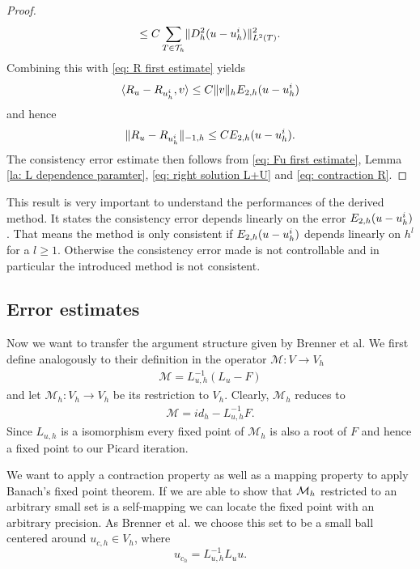 \begin{proof}
\begin{align}
	\leq C \sum_{T \in \mathcal{T}_h} \lVert D_h^2 (u-u_h^i) \rVert_{L^2(T)}^2.
	\end{align}
	Combining this with \eqref{eq: R first estimate} yields
	\begin{align*}
	 \langle R_u - R_{u^i_h}, v \rangle \leq C \lVert v \rVert_{h} E_{2,h}(u-u_h^i)
	\end{align*}
	and hence 
	\begin{align}
	\lVert R_u - R_{u^i_h} \rVert_{-1,h} \leq C E_{2,h}(u-u_h^i). \label{eq: contraction R}
	\end{align}
	The consistency error estimate then follows from \eqref{eq: Fu first estimate}, Lemma \ref{la: L dependence paramter}, \eqref{eq: right solution L+U} and \eqref{eq: contraction R}.
\end{proof}

This result is very important to understand the performances of the derived method. It states the consistency error depends linearly on the error $E_{2,h}(u-u^i_h)$. That means the method is only consistent if $E_{2,h}(u-u^i_h)$ depends linearly on $h^l$ for a $l \geq 1$. Otherwise the consistency error made is not controllable and in particular the introduced method is not consistent.

\subsection{Error estimates}
Now we want to transfer the argument structure given by Brenner et al. We first define analogously to their definition in \cite[(3.1)]{BGN+2011} the operator $\mathcal M: V \rightarrow V_h$
\begin{align}
	\mathcal M = L_{u,h}^{-1}(L_{u} - F)
\end{align}
and let $\mathcal M_h:V_h \rightarrow V_h$ be its restriction to $V_h$. Clearly, $\mathcal M_h$ reduces to 
\begin{align}
\mathcal M = id_h - L_{u,h}^{-1}F.
\end{align}
Since $L_{u,h}$ is a isomorphism every fixed point of $\mathcal M_h$ is also a root of $F$ and hence a fixed point to our Picard iteration.

We want to apply a contraction property as well as a mapping property to apply Banach's fixed point theorem. If we are able to show that $\mathcal M_h$ restricted to an arbitrary small set is a self-mapping we can locate the fixed point with an arbitrary precision. As Brenner et al. \cite[(3.3)]{BGN+2011} we choose this set to be a small ball centered around $u_{c,h}\in V_h$, where
\[
u_{c_h} = L_{u,h}^{-1} L_u u.
\]

